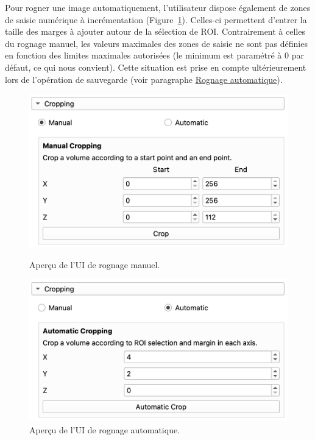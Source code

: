\documentclass{article}
\begin{document}
{{{{                \bigskip

                Pour rogner une image automatiquement, l'utilisateur dispose également de zones de saisie numérique à incrémentation (Figure~\ref{fig:automatic-cropping-ui}). Celles-ci permettent d'entrer la taille des marges à ajouter autour de la sélection de ROI. Contrairement à celles du rognage manuel, les valeurs maximales des zones de saisie ne sont pas définies en fonction des limites maximales autorisées (le minimum est paramétré à 0 par défaut, ce qui nous convient). Cette situation est prise en compte ultérieurement lors de l'opération de sauvegarde (voir paragraphe \hyperref[subsubsubsec:automatic-cropping]{Rognage automatique}).

                \begin{figure}[!ht]
                \centering
                \begin{minipage}[t]{0.45\textwidth}
                    \centering
                    \includegraphics[width=\textwidth]{images/manual-cropping-ui.png}
                    \caption{Aperçu de l'UI de rognage manuel.}
                    \label{fig:manual-cropping-ui}
                \end{minipage}
                \hfill
                \begin{minipage}[t]{0.45\textwidth}
                    \centering
                    \includegraphics[width=\textwidth]{images/automatic-cropping-ui.png}
                    \caption{Aperçu de l'UI de rognage automatique.}
                    \label{fig:automatic-cropping-ui}
                \end{minipage}
                \end{figure}
            }

}}}
\end{document}
